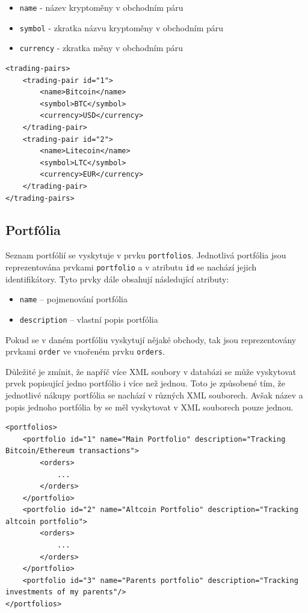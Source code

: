 \documentclass[12pt, a4paper]{article}
\begin{document}
\begin{itemize}
    \item \texttt{name} - název kryptoměny v obchodním páru
    \item \texttt{symbol} - zkratka názvu kryptoměny v obchodním páru 
    \item \texttt{currency} - zkratka měny v obchodním páru 
\end{itemize}


\begin{lstlisting}
<trading-pairs>
    <trading-pair id="1">
        <name>Bitcoin</name>
        <symbol>BTC</symbol>
        <currency>USD</currency>
    </trading-pair>
    <trading-pair id="2">
        <name>Litecoin</name>
        <symbol>LTC</symbol>
        <currency>EUR</currency>
    </trading-pair>
</trading-pairs>
\end{lstlisting}

\subsection{Portfólia}
Seznam portfólií se vyskytuje v prvku \texttt{portfolios}. Jednotlivá portfólia jsou reprezentována prvkami \texttt{portfolio} a v atributu \texttt{id} se nachází jejich identifikátory. Tyto prvky dále obsahují následující atributy:

\begin{itemize}
    \item \texttt{name} -- pojmenování portfólia
    \item \texttt{description} -- vlastní popis portfólia
\end{itemize}

Pokud se v daném portfóliu vyskytují nějaké obchody, tak jsou reprezentovány prvkami \texttt{order} ve vnořeném prvku \texttt{orders}.

Důležité je zmínit, že napříč více XML soubory v databázi se může vyskytovat prvek popisující jedno portfólio i více než jednou. Toto je způsobené tím, že jednotlivé nákupy portfólia se nachází v různých XML souborech. Avšak název a popis jednoho portfólia by se měl vyskytovat v XML souborech pouze jednou.

\begin{lstlisting}
<portfolios>
    <portfolio id="1" name="Main Portfolio" description="Tracking Bitcoin/Ethereum transactions">
        <orders>
            ...
        </orders>
    </portfolio>
    <portfolio id="2" name="Altcoin Portfolio" description="Tracking altcoin portfolio">
        <orders>
            ...
        </orders>
    </portfolio>
    <portfolio id="3" name="Parents portfolio" description="Tracking investments of my parents"/>
</portfolios>

\end{lstlisting}
\end{document}
